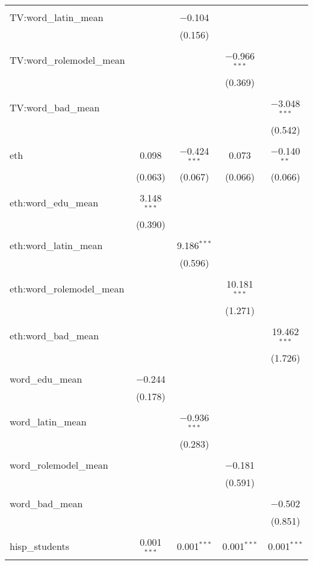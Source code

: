 \begin{table}[!htbp]
\begin{tabular}{@{\extracolsep{-2pt}}lcccc}
  & & & & \\ 
 TV:word\_latin\_mean &  & $-$0.104 &  &  \\ 
  &  & (0.156) &  &  \\ 
  & & & & \\ 
 TV:word\_rolemodel\_mean &  &  & $-$0.966$^{***}$ &  \\ 
  &  &  & (0.369) &  \\ 
  & & & & \\ 
 TV:word\_bad\_mean &  &  &  & $-$3.048$^{***}$ \\ 
  &  &  &  & (0.542) \\ 
  & & & & \\ 
 eth & 0.098 & $-$0.424$^{***}$ & 0.073 & $-$0.140$^{**}$ \\ 
  & (0.063) & (0.067) & (0.066) & (0.066) \\ 
  & & & & \\ 
 eth:word\_edu\_mean & 3.148$^{***}$ &  &  &  \\ 
  & (0.390) &  &  &  \\ 
  & & & & \\ 
 eth:word\_latin\_mean &  & 9.186$^{***}$ &  &  \\ 
  &  & (0.596) &  &  \\ 
  & & & & \\ 
 eth:word\_rolemodel\_mean &  &  & 10.181$^{***}$ &  \\ 
  &  &  & (1.271) &  \\ 
  & & & & \\ 
 eth:word\_bad\_mean &  &  &  & 19.462$^{***}$ \\ 
  &  &  &  & (1.726) \\ 
  & & & & \\ 
 word\_edu\_mean & $-$0.244 &  &  &  \\ 
  & (0.178) &  &  &  \\ 
  & & & & \\ 
 word\_latin\_mean &  & $-$0.936$^{***}$ &  &  \\ 
  &  & (0.283) &  &  \\ 
  & & & & \\ 
 word\_rolemodel\_mean &  &  & $-$0.181 &  \\ 
  &  &  & (0.591) &  \\ 
  & & & & \\ 
 word\_bad\_mean &  &  &  & $-$0.502 \\ 
  &  &  &  & (0.851) \\ 
  & & & & \\ 
 hisp\_students & 0.001$^{***}$ & 0.001$^{***}$ & 0.001$^{***}$ & 0.001$^{***}$ \\ 

\end{tabular}
\end{table}
